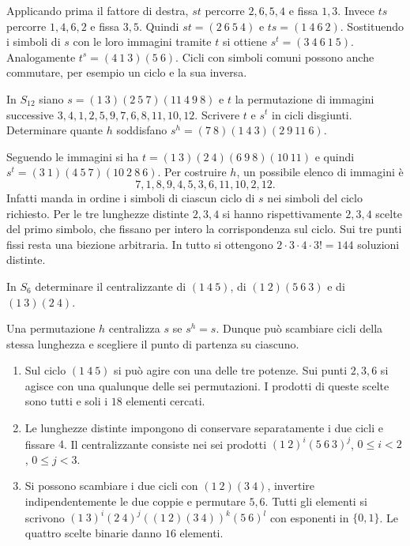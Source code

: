 \begin{svolgimento}
Applicando prima il fattore di destra, $st$ percorre $2,6,5,4$ e fissa $1,3$. Invece $ts$ percorre $1,4,6,2$ e fissa $3,5$. Quindi $st=(2\ 6\ 5\ 4)$ e $ts=(1\ 4\ 6\ 2)$. Sostituendo i simboli di $s$ con le loro immagini tramite $t$ si ottiene $s^t=(3\ 4\ 6\ 1\ 5)$. Analogamente $t^s=(4\ 1\ 3)(5\ 6)$. Cicli con simboli comuni possono anche commutare, per esempio un ciclo e la sua inversa.
\end{svolgimento}
\begin{esercizio}
In $S_{12}$ siano $s=(1\ 3)(2\ 5\ 7)(11\ 4\ 9\ 8)$ e $t$ la permutazione di immagini successive $3,4,1,2,5,9,7,6,8,11,10,12$. Scrivere $t$ e $s^t$ in cicli disgiunti. Determinare quante $h$ soddisfano
$s^h=(7\ 8)(1\ 4\ 3)(2\ 9\ 11\ 6)$.
\end{esercizio}
\begin{svolgimento}
Seguendo le immagini si ha $t=(1\ 3)(2\ 4)(6\ 9\ 8)(10\ 11)$ e quindi $s^t=(3\ 1)(4\ 5\ 7)(10\ 2\ 8\ 6)$. Per costruire $h$, un possibile elenco di immagini è
\[
 7,1,8,9,4,5,3,6,11,10,2,12 .
\]
Infatti manda in ordine i simboli di ciascun ciclo di $s$ nei simboli del ciclo richiesto. Per le tre lunghezze distinte $2,3,4$ si hanno rispettivamente $2,3,4$ scelte del primo simbolo, che fissano per intero la corrispondenza sul ciclo. Sui tre punti fissi resta una biezione arbitraria. In tutto si ottengono $2\cdot3\cdot4\cdot3!=144$ soluzioni distinte.
\end{svolgimento}
\begin{esercizio}
In $S_6$ determinare il centralizzante di $(1\ 4\ 5)$, di $(1\ 2)(5\ 6\ 3)$ e di $(1\ 3)(2\ 4)$.
\end{esercizio}
\begin{svolgimento}
Una permutazione $h$ centralizza $s$ se $s^h=s$. Dunque può scambiare cicli della stessa lunghezza e scegliere il punto di partenza su ciascuno.
\begin{enumerate}
\item Sul ciclo $(1\ 4\ 5)$ si può agire con una delle tre potenze. Sui punti $2,3,6$ si agisce con una qualunque delle sei permutazioni. I prodotti di queste scelte sono tutti e soli i $18$ elementi cercati.
\item Le lunghezze distinte impongono di conservare separatamente i due cicli e fissare $4$. Il centralizzante consiste nei sei prodotti $(1\ 2)^i(5\ 6\ 3)^j$, $0\le i<2$, $0\le j<3$.
\item Si possono scambiare i due cicli con $(1\ 2)(3\ 4)$, invertire indipendentemente le due coppie e permutare $5,6$. Tutti gli elementi si scrivono $(1\ 3)^i(2\ 4)^j((1\ 2)(3\ 4))^k(5\ 6)^l$ con esponenti in $\{0,1\}$. Le quattro scelte binarie danno $16$ elementi.
\end{enumerate}
\end{svolgimento}

